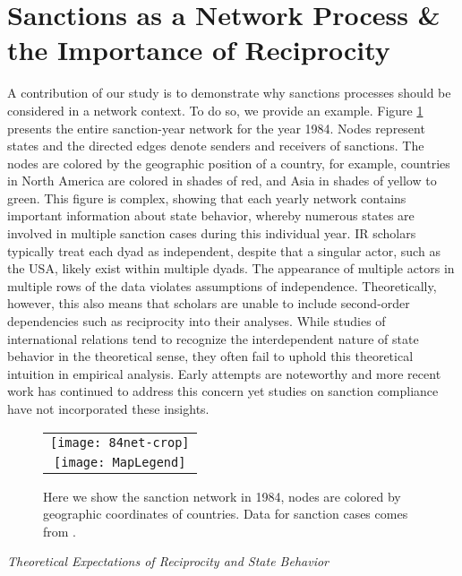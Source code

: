 \section*{Sanctions as a Network Process \& the Importance of Reciprocity}
\label{neteffects}

A contribution of our study is to demonstrate why sanctions processes should be considered in a network context. To do so, we provide an example. Figure \ref{fig:spaghetti} presents the entire sanction-year network for the year 1984.  Nodes represent states and the directed edges denote senders and receivers of sanctions. The nodes are colored by the geographic position of a country, for example, countries in North America are colored in shades of red, and Asia in shades of yellow to green. This figure is complex, showing that each yearly network contains important information about state behavior, whereby numerous states are involved in multiple sanction cases during this individual year. IR scholars typically treat each dyad as independent, despite that a singular actor, such as the USA, likely exist within multiple dyads. The appearance of multiple actors in multiple rows of the data violates assumptions of independence. Theoretically, however, this also means that scholars are unable to include second-order dependencies such as reciprocity into their analyses. While studies of international relations tend to recognize the interdependent nature of state behavior in the theoretical sense, they often fail to uphold this theoretical intuition in empirical analysis. Early attempts are noteworthy \citep{goldstein1991reciprocity, keohane1989reciprocity} and more recent work has continued to address this concern \citep{cranmer2014reciprocity, mitchell2001} yet studies on sanction compliance have not incorporated these insights. 

\begin{figure}[ht]
  \centering
  \begin{tabular}{c}
	  \texttt{[image: 84net-crop]} \\
	  \texttt{[image: MapLegend]}
  \end{tabular}
  \caption{Here we show the sanction network in 1984, nodes are colored by geographic coordinates of countries. Data for sanction cases comes from \citet{morgan2009threat}.}
  \label{fig:spaghetti}
\end{figure}
\FloatBarrier


\begin{center}
\textit{Theoretical Expectations of Reciprocity and State Behavior}\\
\end{center}

